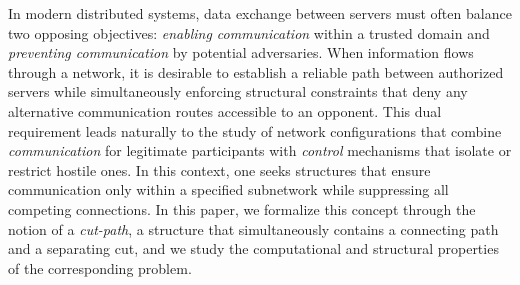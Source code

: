 In modern distributed systems, data exchange between servers must often balance two opposing objectives:
\emph{enabling communication} within a trusted domain and \emph{preventing communication} by potential adversaries.
When information flows through a network, it is desirable to establish a reliable path between authorized servers
while simultaneously enforcing structural constraints that deny any alternative communication routes accessible to an opponent.
This dual requirement leads naturally to the study of network configurations that combine
\emph{communication} for legitimate participants with \emph{control} mechanisms that isolate or restrict hostile ones.
In this context, one seeks structures that ensure communication only within a specified subnetwork while suppressing all competing connections.
In this paper, we formalize this concept through the notion of a \emph{cut-path},
a structure that simultaneously contains a connecting path and a separating cut,
and we study the computational and structural properties of the corresponding \MinCutPath{} problem.

